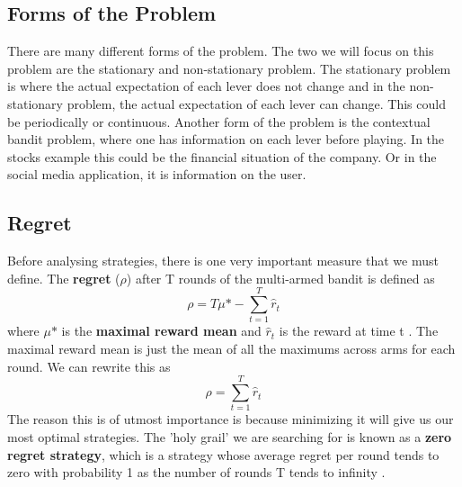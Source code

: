 \subsection{Forms of the Problem}\label{subsec:forms-of-the-problem}
There are many different forms of the problem.
The two we will focus on this problem are the stationary and non-stationary problem.
The stationary problem is where the actual expectation of each lever does not change and in the non-stationary problem, the actual expectation of each lever can change.
This could be periodically or continuous.
Another form of the problem is the contextual bandit problem, where one has information on each lever before playing.
In the stocks example this could be the financial situation of the company.
Or in the social media application, it is information on the user.

\subsection{Regret}\label{subsec:regret}
Before analysing strategies, there is one very important measure that we must define.
The \textbf{regret} ($\rho$) after T rounds of the multi-armed bandit is defined as $$\rho = T\mu\mbox{*} - \sum_{t=1}^T\hat{r}_t$$ where $\mu\mbox{*}$ is the \textbf{maximal reward mean} and $\hat{r}_t$ is the reward at time t \citep{vermorel}.
The maximal reward mean is just the mean of all the maximums across arms for each round.
We can rewrite this as $$\rho = \sum_{t=1}^T\hat{r}_t$$ The reason this is of utmost importance is because minimizing it will give us our most optimal strategies.
The 'holy grail' we are searching for is known as a \textbf{zero regret strategy}, which is a strategy whose average regret per round tends to zero with probability 1 as the number of rounds T tends to infinity \citep{vermorel}.

